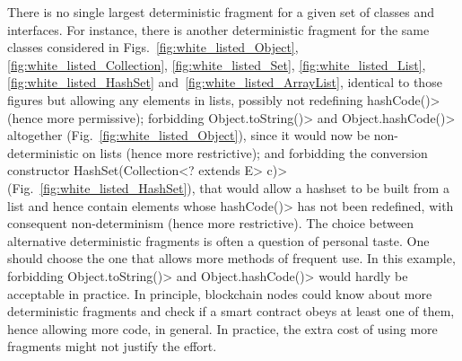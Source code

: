 There is no single largest deterministic fragment
for a given set of classes and interfaces. For instance, 
there is another deterministic fragment for the same classes considered in
Figs.~\ref{fig:white_listed_Object}, \ref{fig:white_listed_Collection},
\ref{fig:white_listed_Set}, \ref{fig:white_listed_List},
\ref{fig:white_listed_HashSet} and~\ref{fig:white_listed_ArrayList}, identical
to those figures but allowing any elements in lists, possibly not redefining
\<hashCode()> (hence more permissive);
forbidding \<Object.toString()> and \<Object.hashCode()> altogether
(Fig.~\ref{fig:white_listed_Object}),
since it would now be non-deterministic on lists (hence
more restrictive); and forbidding the conversion constructor
\<HashSet(Collection$\text{<}$? extends E$\text{>}$ c)>
(Fig.~\ref{fig:white_listed_HashSet}), that would allow a hashset to be
built from a list and hence contain elements whose \<hashCode()> has not been redefined,
with consequent non-determinism (hence more restrictive). The choice between alternative
deterministic fragments is often a question of personal taste.
One should choose the one that allows more methods of frequent use. In this example,
forbidding \<Object.toString()> and \<Object.hashCode()> would hardly be acceptable in practice.
In principle, blockchain nodes could know about more deterministic fragments and check
if a smart contract obeys at least one of them, hence allowing more code, in general.
In practice, the extra cost of using more fragments might not justify the effort.
